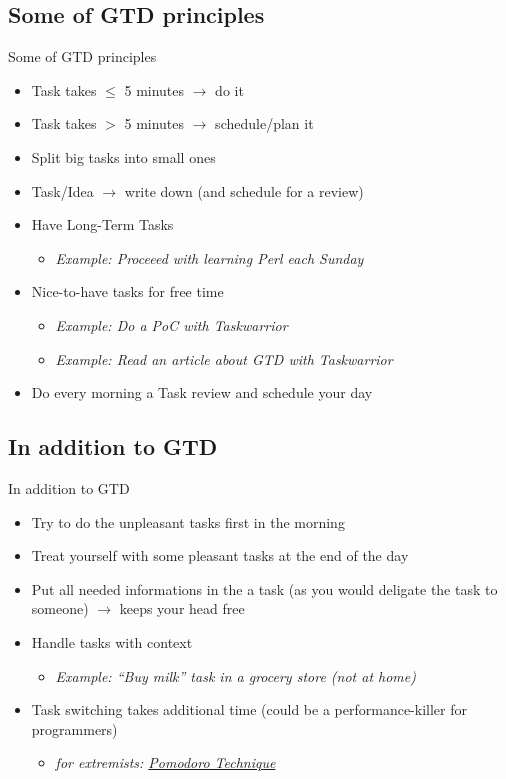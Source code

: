 \documentclass[xcolor=x11names,compress]{beamer}
\renewcommand{\(}{\begin{columns}}
\renewcommand{\)}{\end{columns}}
\newcommand{\<}[1]{\begin{column}{#1}}
\renewcommand{\>}{\end{column}}
\begin{document}
\subsection{Some of GTD principles}

\begin{frame}{Some of GTD principles}
\pause
	\begin{itemize}[<+-| alert@+>]
		\item Task takes $\leq$ 5 minutes $\rightarrow$ do it
		\item Task takes $>$ 5 minutes $\rightarrow$ schedule/plan it
		\item Split big tasks into small ones
		\item Task/Idea $\rightarrow$ write down (and schedule for a review)
		\item Have Long-Term Tasks
		\begin{itemize}[<+-| alert@+>]
			\item \textit{Example: Proceeed with learning Perl each Sunday}
		\end{itemize}
		\item Nice-to-have tasks for free time
		\begin{itemize}
			\item \textit{Example: Do a PoC with Taskwarrior}
			\item \textit{Example: Read an article about GTD with Taskwarrior}
		\end{itemize}
		\item Do every morning a Task review and schedule your day
	\end{itemize}
\end{frame}

\subsection{In addition to GTD}
\begin{frame}{In addition to GTD}
\pause
	\begin{itemize}[<+-| alert@+>]
		\item Try to do the unpleasant tasks first in the morning
		\item Treat yourself with some pleasant tasks at the end of the day
		\item Put all needed informations in the a task (as you would deligate the task to someone) $\rightarrow$ keeps your head free
		\item Handle tasks with context
		\begin{itemize}
			\item \textit{Example: ``Buy milk'' task in a grocery store (not at home)}
		\end{itemize}
		\item Task switching takes additional time (could be a performance-killer for programmers)
		\begin{itemize}
			\item \textit{for extremists: \href{https://en.wikipedia.org/wiki/Pomodoro_Technique}{Pomodoro Technique}}
		\end{itemize}
	\end{itemize}
\end{frame}
\end{document}
